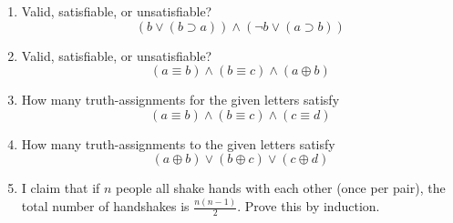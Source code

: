 \begin{mdframed}[linewidth=1]
\begin{enumerate}
    \item Valid, satisfiable, or unsatisfiable?
    \[
        (b \vee (b \supset a)) \land (\lnot b \vee (a \supset b))
    \]

    \item Valid, satisfiable, or unsatisfiable?
    \[
        (a \equiv b) \land (b \equiv c) \land (a \oplus b)
    \]

    \item How many truth-assignments for the given letters satisfy 
    \[
         (a \equiv b) \land (b \equiv c) \land (c \equiv d)
     \] 

     \item How many truth-assignments to the given letters satisfy
    \[
        (a \oplus b) \vee (b \oplus c) \vee (c \oplus d)
    \]

    \item I claim that if $n$ people all shake hands with each other (once per pair), the total number of handshakes is $\frac{n(n-1)}{2}$. Prove this by induction. 
\end{enumerate}
\end{mdframed}
\newpage
